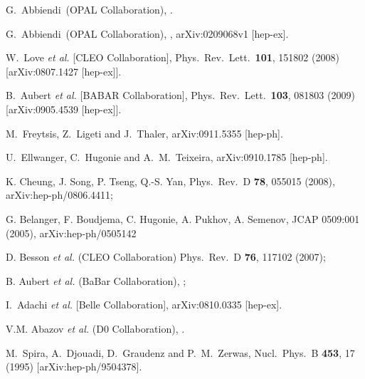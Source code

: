 \documentclass[aps,prl,twocolumn,nofootinbib,superscriptaddress]{revtex4}
\begin{document}
\begin{thebibliography}{99}
 G.~Abbiendi~\etal (OPAL Collaboration),
.

 G.~Abbiendi~\etal (OPAL Collaboration),
, arXiv:0209068v1 [hep-ex].

  W.~Love {\it et al.}  [CLEO Collaboration],
  Phys.\ Rev.\ Lett.\  {\bf 101}, 151802 (2008)
  [arXiv:0807.1427 [hep-ex]].

  B.~Aubert {\it et al.}  [BABAR Collaboration],
  Phys.\ Rev.\ Lett.\  {\bf 103}, 081803 (2009)
  [arXiv:0905.4539 [hep-ex]].

  M.~Freytsis, Z.~Ligeti and J.~Thaler,
  arXiv:0911.5355 [hep-ph].

  U.~Ellwanger, C.~Hugonie and A.~M.~Teixeira,
  arXiv:0910.1785 [hep-ph].

 K. Cheung, J. Song, P. Tseng, Q.-S. Yan, Phys.\ Rev.\ D {\bf 78}, 055015 (2008), arXiv:hep-ph/0806.4411; 

 G. Belanger, F. Boudjema, C. Hugonie, A. Pukhov, A. Semenov, JCAP 0509:001 (2005), arXiv:hep-ph/0505142

 D. Besson {\it et al.} (CLEO Collaboration) Phys.\ Rev.\ D {\bf 76}, 117102 (2007); 

 B. Aubert {\it et al.} (BaBar Collaboration), ;

  I.~Adachi {\it et al.}  [Belle Collaboration],
  arXiv:0810.0335 [hep-ex].

 V.M. Abazov {\it et al.} (D0 Collaboration), .


  M.~Spira, A.~Djouadi, D.~Graudenz and P.~M.~Zerwas,
  Nucl.\ Phys.\  B {\bf 453}, 17 (1995)
  [arXiv:hep-ph/9504378].


\end{thebibliography}
\end{document}
